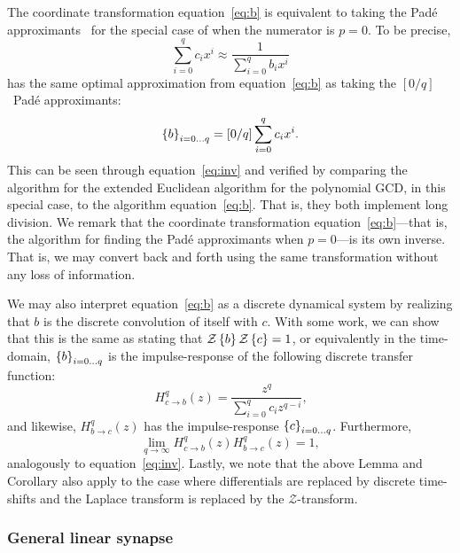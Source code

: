 The coordinate transformation equation~\ref{eq:b} is equivalent to taking the Pad\'e approximants~\citep{Pade1892} for the special case of when the numerator is $p = 0$.
To be precise,
$$
\sum_{i=0}^{q} c_i x^i \approx \frac{1}{\sum_{i=0}^q b_i x^i}
$$
has the same optimal approximation from equation~\ref{eq:b} as taking the $[0/q]$~Pad\'e approximants:
$$
\left\{ b \right\}_{i=0 \ldots q} = \left[ 0 / q \right] \sum_{i=0}^{q} c_i x^i \text{.}
$$
This can be seen through equation~\ref{eq:inv} and verified by comparing the algorithm for the extended Euclidean algorithm for the polynomial GCD, in this special case, to the algorithm equation~\ref{eq:b}. That is, they both implement long division.
We remark that the coordinate transformation equation~\ref{eq:b}---that is, the algorithm for finding the Pad\'e approximants when $p = 0$---is its own inverse. That is, we may convert back and forth using the same transformation without any loss of information.

We may also interpret equation~\ref{eq:b} as a discrete dynamical system by realizing that $b$ is the discrete convolution of itself with $c$. With some work, we can show that this is the same as stating that $\mathcal{Z} \left\{ b \right\}\mathcal{Z} \left\{ c \right\} = 1$, or equivalently in the time-domain, $\left\{ b \right\}_{i=0\ldots q}$ is the impulse-response of the following discrete transfer function:
$$
H^q_{c \rightarrow b}(z) = \frac{z^{q}}{\sum_{i=0}^q c_i z^{q - i}} \text{,}
$$
and likewise, $H^q_{b \rightarrow c}(z)$ has the impulse-response $\left\{ c \right\}_{i=0\ldots q}$.
Furthermore, $$\lim_{q \rightarrow \infty} H^q_{c \rightarrow b}(z) H^q_{b \rightarrow c}(z) = 1,$$ analogously to equation~\ref{eq:inv}.
Lastly, we note that the above Lemma and Corollary also apply to the case where differentials are replaced by discrete time-shifts and the Laplace transform is replaced by the $\mathcal{Z}$-transform.

\subsubsection{General linear synapse}
\label{sec:general-linear-synapse}

